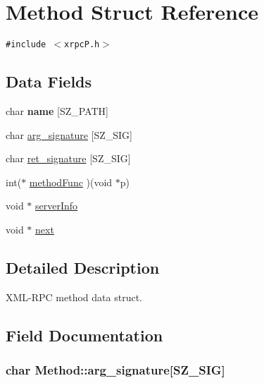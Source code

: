 \hypertarget{structMethod}{
\section{Method Struct Reference}
\label{structMethod}
}
{\tt \#include $<$xrpcP.h$>$}

\subsection*{Data Fields}
\begin{CompactItemize}
\item 
\hypertarget{structMethod_31b5df1ad5bcd5595944357bfb4ccd8f}{
char \textbf{name} \mbox{[}SZ\_\-PATH\mbox{]}}
\label{structMethod_31b5df1ad5bcd5595944357bfb4ccd8f}

\item 
char \hyperlink{structMethod_1d628bc2c995d07a736ae828c01c4c91}{arg\_\-signature} \mbox{[}SZ\_\-SIG\mbox{]}
\item 
char \hyperlink{structMethod_36b279c8c386e858838167a9464415b4}{ret\_\-signature} \mbox{[}SZ\_\-SIG\mbox{]}
\item 
int($\ast$ \hyperlink{structMethod_85a3d15d92263dff37d46aeefd9a3130}{methodFunc} )(void $\ast$p)
\item 
void $\ast$ \hyperlink{structMethod_e8ee031515917a254fb39016c1a7df87}{serverInfo}
\item 
void $\ast$ \hyperlink{structMethod_592bee93da850f60c429e916bb2919f6}{next}
\end{CompactItemize}


\subsection{Detailed Description}
XML-RPC method data struct. 

\subsection{Field Documentation}
\hypertarget{structMethod_1d628bc2c995d07a736ae828c01c4c91}{
\subsubsection[{arg\_\-signature}]{\setlength{\rightskip}{0pt plus 5cm}char {\bf Method::arg\_\-signature}\mbox{[}SZ\_\-SIG\mbox{]}}}
\label{structMethod_1d628bc2c995d07a736ae828c01c4c91}


